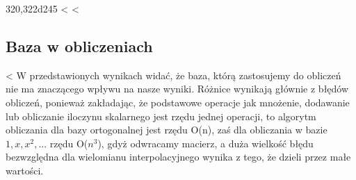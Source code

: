 320,322d245
< 
< \subsection{Baza w obliczeniach}
< W przedstawionych wynikach widać, że baza, którą zastosujemy do obliczeń nie ma znaczącego wpływu na nasze wyniki. Różnice wynikają głównie z błędów obliczeń, ponieważ zakładając, że podstawowe operacje jak mnożenie, dodawanie lub obliczanie iloczynu skalarnego jest rzędu jednej operacji, to algorytm obliczania dla bazy ortogonalnej jest rzędu O(n), zaś dla obliczania w bazie {$1, x, x^{2}, ...$} rzędu O($n^{3}$), gdyż odwracamy macierz, a duża wielkość błędu bezwzględna dla wielomianu interpolacyjnego wynika z tego, że dzieli przez małe wartości.
